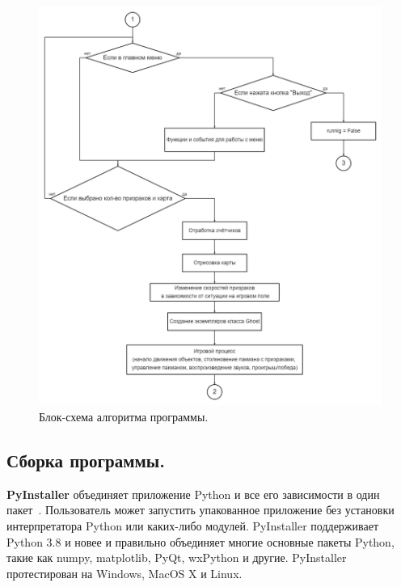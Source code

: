 \begin{figure}[H]
	\centering
	\includegraphics[width=1\linewidth]{images/flow2.png}
	\caption{Блок-схема алгоритма программы.}
	\label{fig8}
\end{figure}

\subsection{\label{subsec:ch02/sec01/sub09}Сборка программы.}
\textbf{PyInstaller} объединяет приложение Python и все его зависимости в один пакет~\cite{pyinstEN}. Пользователь может запустить упакованное приложение без установки интерпретатора Python или каких-либо модулей. PyInstaller поддерживает Python 3.8 и новее и правильно объединяет многие основные пакеты Python, такие как numpy, matplotlib, PyQt, wxPython и другие. PyInstaller протестирован на Windows, MacOS X и Linux.


